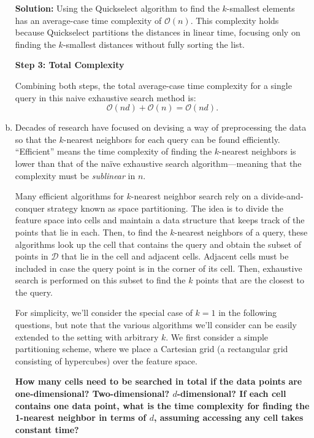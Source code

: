 \documentclass{article}
\newenvironment{solution}{\color{blue} \smallskip \textbf{Solution:}}{}
\begin{document}
\begin{enumerate}[(a)]
\begin{solution}
Using the Quickselect algorithm to find the \(k\)-smallest elements has an average-case time complexity of \(\mathcal{O}(n)\). This complexity holds because Quickselect partitions the distances in linear time, focusing only on finding the \(k\)-smallest distances without fully sorting the list.

\textbf{Step 3: Total Complexity}

Combining both steps, the total average-case time complexity for a single query in this naive exhaustive search method is:
\[
\mathcal{O}(nd) + \mathcal{O}(n) = \mathcal{O}(nd).
\]






    \end{solution}

    \newpage
    \item 
    Decades of research have focused on devising a way of preprocessing the data so that the $k$-nearest neighbors for each query can be found efficiently. 
    ``Efficient'' means the time complexity of finding the $k$-nearest neighbors is lower than that of the na\"{i}ve exhaustive search algorithm---meaning that the complexity must be \emph{sublinear} in $n$.
    
    Many efficient algorithms for $k$-nearest neighbor search rely on a divide-and-conquer strategy known as space partitioning. 
    The idea is to divide the feature space into cells and maintain a data structure that keeps track of the points that lie in each. 
    Then, to find the $k$-nearest neighbors of a query, these algorithms look up the cell that contains the query and obtain the subset of points in $\mathcal{D}$ that lie in the cell and adjacent cells. 
    Adjacent cells must be included in case the query point is in the corner of its cell. 
    Then, exhaustive search is performed on this subset to find the $k$ points that are the closest to the query.
    
    For simplicity, we'll consider the special case of $k = 1$ in the following questions, but note that the various algorithms we'll consider can be easily extended to the setting with arbitrary $k$. 
    We first consider a simple partitioning scheme, where we place a Cartesian grid (a rectangular grid consisting of hypercubes) over the feature space.
    
    {\bf How many cells need to be searched in total if the data points are one-dimensional? Two-dimensional? $d$-dimensional? 
    If each cell contains one data point, what is the time complexity for finding the 1-nearest neighbor in terms of $d$, assuming accessing any cell takes constant time?}
    

\end{enumerate}
\end{document}
